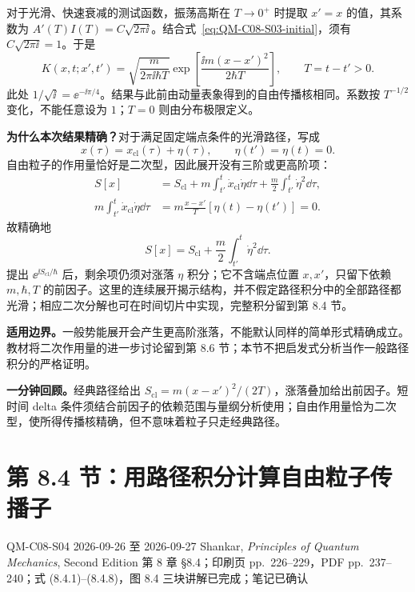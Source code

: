 对于光滑、快速衰减的测试函数，振荡高斯在 $T\to0^+$ 时提取 $x'=x$ 的值，其系数为 $A'(T)I(T)=C\sqrt{2\pi\ii}$。结合式~\eqref{eq:QM-C08-S03-initial}，须有 $C\sqrt{2\pi\ii}=1$。于是
\begin{equation}
  \boxed{K(x,t;x',t')=\sqrt{\frac{m}{2\pi\ii\hbar T}}
    \exp\!\left[\frac{\ii m(x-x')^2}{2\hbar T}\right]},
  \qquad T=t-t'>0.
  \label{eq:QM-C08-S03-free-kernel}
\end{equation}
此处 $1/\sqrt{\ii}=\ee^{-\ii\pi/4}$。结果与此前由动量表象得到的自由传播核相同。系数按 $T^{-1/2}$ 变化，不能任意设为 $1$；$T=0$ 则由分布极限定义。

\textbf{为什么本次结果精确？}对于满足固定端点条件的光滑路径，写成
\begin{equation}
  x(\tau)=x_{\mathrm{cl}}(\tau)+\eta(\tau),\qquad
  \eta(t')=\eta(t)=0.
\end{equation}
自由粒子的作用量恰好是二次型，因此展开没有三阶或更高阶项：
\begin{align}
  S[x]&=S_{\mathrm{cl}}
    +m\int_{t'}^t\dot x_{\mathrm{cl}}\dot\eta\dd\tau
    +\frac m2\int_{t'}^t\dot\eta^2\dd\tau,\\
  m\int_{t'}^t\dot x_{\mathrm{cl}}\dot\eta\dd\tau
    &=m\frac{x-x'}{T}[\eta(t)-\eta(t')]=0.
\end{align}
故精确地
\begin{equation}
  \boxed{S[x]=S_{\mathrm{cl}}+\frac m2\int_{t'}^t\dot\eta^2\dd\tau}.
\end{equation}
提出 $\ee^{\ii S_{\mathrm{cl}}/\hbar}$ 后，剩余项仍须对涨落 $\eta$ 积分；它不含端点位置 $x,x'$，只留下依赖 $m,\hbar,T$ 的前因子。这里的连续展开揭示结构，并不假定路径积分中的全部路径都光滑；相应二次分解也可在时间切片中实现，完整积分留到第 8.4 节。

\textbf{适用边界。}一般势能展开会产生更高阶涨落，不能默认同样的简单形式精确成立。教材将二次作用量的进一步讨论留到第 8.6 节；本节不把启发式分析当作一般路径积分的严格证明。

\textbf{一分钟回顾。}经典路径给出 $S_{\mathrm{cl}}=m(x-x')^2/(2T)$，涨落叠加给出前因子。短时间 delta 条件须结合前因子的依赖范围与量纲分析使用；自由作用量恰为二次型，使所得传播核精确，但不意味着粒子只走经典路径。

\section{第 8.4 节：用路径积分计算自由粒子传播子}
\label{section:QM-C08-S04}
\studymeta
  {QM-C08-S04}
  {2026-09-26 至 2026-09-27}
  {Shankar, \textit{Principles of Quantum Mechanics}, Second Edition}
  {第 8 章 \S 8.4；印刷页 pp.~226--229，PDF pp.~237--240；式 (8.4.1)--(8.4.8)，图 8.4}
  {三块讲解已完成；笔记已确认}

